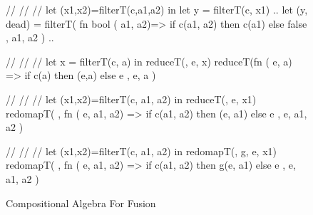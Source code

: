 \begin{figure}[bt]
\begin{colorcode}
//
//
//
let (x1,x2)=filterT(c,a1,a2)
in  let y = filterT(c, x1) ..
    \emphh{\mymath{\equiv}}
let (y, dead) = filterT(
  fn bool ( a1, a2)=> 
      if   c(a1, a2) 
      then c(a1) 
      else false 
, a1, a2 ) ..

//
//
//
let x = filterT(c, a)
in  reduceT(\mymath{\oplus}, e, x)
    \emphh{\mymath{\equiv}}
reduceT(fn \mymath{\beta} (\mymath{\beta} e, \mymath{\beta} a) =>
  if c(a) then \mymath{\oplus}(e,a) else e
, e, a )

//
//
//
let (x1,x2)=filterT(c, a1, a2)
in  reduceT(\mymath{\oplus}, e, x1)
    \emphh{\mymath{\equiv}}
redomapT(\mymath{\oplus}
, fn \mymath{\beta} (\mymath{\beta} e,  a1,  a2)
   => if c(a1, a2)
      then \mymath{\oplus}(e, a1) else e
, e, a1, a2 )

//
//
//
let (x1,x2)=filterT(c, a1, a2)
in  redomapT(\mymath{\oplus}, g, e, x1)
    \emphh{\mymath{\equiv}}
redomapT(\mymath{\oplus}
, fn \mymath{\beta} (\mymath{\beta} e,  a1,  a2)
   => if c(a1, a2)
      then g(e, a1) else e
, e, a1, a2 )
\end{colorcode}
\caption{Compositional Algebra For Fusion}
\label{fig:fusion-algebra}
\end{figure}


